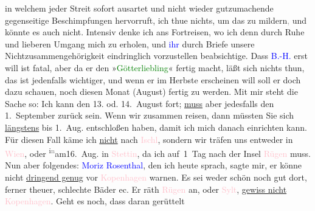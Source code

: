                in welchem jeder Streit sofort ausartet und nicht wieder gutzumachende gegenseitige
               Beschimpfungen hervorruft, ich thue nichts, um das zu mildern\textcolor{gray}{,}{ }{\pb}und könnte es auch nicht.
               Intensiv denke ich ans Fortreisen, wo ich denn durch Ruhe und lieberen Umgang mich zu
               erholen, und \textcolor{blue}{ihr}{}\ledrightnote{{$\rightarrow$}\textcolor{blue}{Charlotte Pohl-Glas}} durch Briefe unsere Nichtzusammengehörigkeit eindringlich vorzustellen
               beabsichtige. Dass \textcolor{blue}{B.-H.}{}\ledrightnote{\textcolor{blue}{Richard Beer-Hofmann}} erst \label{K_L03159-5v}\label{K_L03159-5h} will ist fatal, aber da er den »\textcolor{green}{Götterliebling}{}\ledrightnote{\textcolor{green}{Der Tod Georgs}}« fertig macht, läßt sich nichts thun, das ist jedenfalls
               wichtiger, und wenn er im Herbste erscheinen will soll er doch dazu schauen, noch
               diesen Monat (August) fertig zu werden. Mit mir steht die
               Sache so: Ich kann den 13. od. 14. August fort; \uline{muss} aber jedesfalls den
                  1. September zurück sein. Wenn wir zusammen reisen,
               dann müssten Sie sich \uline{längstens} bis 1. Aug. entschloßen haben, damit ich mich danach
               einrichten kann. Für diesen Fall käme ich \uline{nicht} nach
                  \textcolor{pink}{Ischl}{}\ledrightnote{\textcolor{pink}{Bad Ischl}}, sondern wir träfen uns entweder in \textcolor{pink}{Wien}{}\ledrightnote{\textcolor{pink}{Wien}}, oder \substVorne{}\textsuperscript{i\textcolor{gray}{n}}\substDazwischen{}am\substHinten{}{ }16. Aug. in \textcolor{pink}{Stettin}{}\ledrightnote{\textcolor{pink}{Szczecin}}, da ich auf 1 Tag nach der Insel \textcolor{pink}{Rügen}{}\ledrightnote{\textcolor{pink}{Rügen}} muss. Nun aber folgendes: \textcolor{blue}{Moriz
                  Rosenthal}{}\ledrightnote{\textcolor{blue}{Moritz Rosenthal}}, den ich heute sprach, sagte mir, er
               könne nicht \uline{dringend genug} vor \textcolor{pink}{Kopenhagen}{}\ledrightnote{\textcolor{pink}{Kopenhagen}} warnen. Es sei weder schön noch gut dort, ferner
               theuer, schlechte Bäder ec. Er räth \textcolor{pink}{Rügen}{}\ledrightnote{\textcolor{pink}{Rügen}} an,
               oder \textcolor{pink}{Sylt}{}\ledrightnote{\textcolor{pink}{Sylt}}, \uline{gewiss
                  nicht}{ }\textcolor{pink}{Kopenhagen}{}\ledrightnote{\textcolor{pink}{Kopenhagen}}. Geht es noch, dass daran gerüttelt
